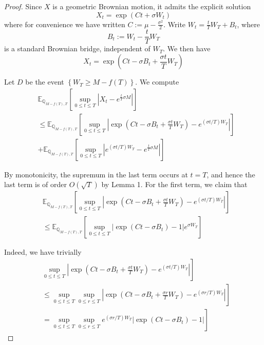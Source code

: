 \documentclass[10pt,a4paper]{amsart}
\begin{document}
\begin{proof}Since $X$ is a geometric Brownian motion, it admits the explicit solution
$$
X_{t}=\exp \left(C t+\sigma W_{t}\right)
$$
where for convenience we have written $C:=\mu-\frac{\sigma^{2}}{2}$. Write $W_{t}=\frac{t}{T} W_{T}+B_{t}$, where
$$
B_{t}:=W_{t}-\frac{t}{T} W_{T}
$$
is a standard Brownian bridge, independent of $W_{T}$. We then have
$$
X_{t}=\exp \left(C t-\sigma B_{t}+\frac{\sigma t}{T} W_{T}\right)
$$

Let $D$ be the event $\left\{W_{T} \geq M-f(T)\right\}$. We compute
$$
\begin{aligned}
& \mathbb{E}_{\mathbb{Q}_{M-f(T), T}}\left[\sup _{0 \leq t \leq T}\left|X_{t}-e^{\frac{t}{T} \sigma M}\right|\right] \\
& \leq \mathbb{E}_{\mathbb{Q}_{M-f(T), T}}\left[\sup _{0 \leq t \leq T}\left|\exp \left(C t-\sigma B_{t}+\frac{\sigma t}{T} W_{T}\right)-e^{(\sigma t / T) W_{T}}\right|\right] \\
& +\mathbb{E}_{\mathbb{Q}_{M-f(T), T}}\left[\sup _{0 \leq t \leq T}\left|e^{(\sigma t / T) W_{T}}-e^{\frac{t}{T} \sigma M}\right|\right]
\end{aligned}
$$

By monotonicity, the supremum in the last term occurs at $t=T$, and hence the last term is of order $O(\sqrt{T})$ by Lemma 1. For the first term, we claim that
$$
\begin{aligned}
& \mathbb{E}_{\mathbb{Q}_{M-f(T), T}} {\left[\sup _{0 \leq t \leq T}\left|\exp \left(C t-\sigma B_{t}+\frac{\sigma t}{T} W_{T}\right)-e^{(\sigma t / T) W_{T}}\right|\right] } \\
& \leq \mathbb{E}_{\mathbb{Q}_{M-f(T), T}}\left[\sup _{0 \leq t \leq T}\left|\exp \left(C t-\sigma B_{t}\right)-1\right| e^{\sigma W_{T}}\right] 
\end{aligned}
$$

Indeed, we have trivially
$$
\begin{aligned}
& \left.\sup _{0 \leq t \leq T}\left|\exp \left(C t-\sigma B_{t}+\frac{\sigma t}{T} W_{T}\right)-e^{(\sigma t / T) W_{T}}\right|\right] \\
& \left.\leq \sup _{0 \leq t \leq T} \sup _{0 \leq r \leq T}\left|\exp \left(C t-\sigma B_{t}+\frac{\sigma r}{T} W_{T}\right)-e^{(\sigma r / T) W_{T}}\right|\right] \\
& \left.=\sup _{0 \leq t \leq T} \sup _{0 \leq r \leq T} e^{(\sigma r / T) W_{T}}\left|\exp \left(C t-\sigma B_{t}\right)-1\right|\right]
\end{aligned}
$$


\end{proof}
\end{document}
